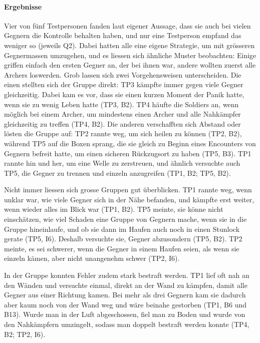 \documentclass[../Main.tex]{subfiles}
\begin{document}
\paragraph{Ergebnisse}
Vier von fünf Testpersonen fanden laut eigener Aussage, dass sie auch bei vielen Gegnern die Kontrolle behalten haben, und nur eine Testperson empfand das weniger so (jeweils Q2). Dabei hatten alle eine eigene Strategie, um mit grösseren Gegnermassen umzugehen, und es liessen sich ähnliche Muster beobachten: Einige griffen einfach den ersten Gegner an, der bei ihnen war, andere wollten zuerst alle Archers loswerden. Grob lassen sich zwei Vorgehensweisen unterscheiden. Die einen stellten sich der Gruppe direkt: TP3 kämpfte immer gegen viele Gegner gleichzeitig. Dabei kam es vor, dass sie einen kurzen Moment der Panik hatte, wenn sie zu wenig Leben hatte (TP3, B2). TP4 häufte die Soldiers an, wenn möglich bei einem Archer, um mindestens einen Archer und alle Nahkämpfer gleichzeitig zu treffen (TP4, B2). Die anderen verschafften sich Abstand oder lösten die Gruppe auf: TP2 rannte weg, um sich heilen zu können (TP2, B2), während TP5 auf die Boxen sprang, die sie gleich zu Beginn eines Encounters von Gegnern befreit hatte, um einen sicheren Rückzugsort zu haben (TP5, B3). TP1 rannte hin und her, um eine Welle zu zerstreuen, und ähnlich versuchte auch TP5, die Gegner zu trennen und einzeln anzugreifen (TP1, B2; TP5, B2).

Nicht immer liessen sich grosse Gruppen gut überblicken. TP1 rannte weg, wenn unklar war, wie viele Gegner sich in der Nähe befanden, und kämpfte erst weiter, wenn wieder alles im Blick war (TP1, B2). TP5 meinte, sie könne nicht einschätzen, wie viel Schaden eine Gruppe von Gegnern mache, wenn sie in die Gruppe hineinlaufe, und ob sie dann im Haufen auch noch in einen Stunlock gerate (TP5, I6). Deshalb versuchte sie, Gegner abzusondern (TP5, B2). TP2 meinte, es sei schwerer, wenn die Gegner in einem Haufen seien, als wenn sie einzeln kämen, aber nicht unangenehm schwer (TP2, I6).

In der Gruppe konnten Fehler zudem stark bestraft werden. TP1 lief oft nah an den Wänden und versuchte einmal, direkt an der Wand zu kämpfen, damit alle Gegner aus einer Richtung kamen. Bei mehr als drei Gegnern kam sie dadurch aber kaum noch von der Wand weg und wäre beinahe gestorben (TP1, B6 und B13). Wurde man in der Luft abgeschossen, fiel man zu Boden und wurde von den Nahkämpfern umzingelt, sodass man doppelt bestraft werden konnte (TP4, B2; TP2, I6).
\end{document}

